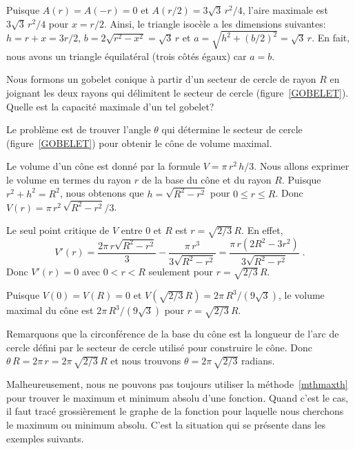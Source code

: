 {\begin{egg}[\eng]
Puisque $A(r) = A(-r) = 0$ et $A(r/2) = 3\sqrt{3}\, r^2/4$, l'aire
maximale est $3\sqrt{3}\, r^2/4$ pour $x=r/2$.  Ainsi, le triangle
isocèle a les dimensions suivantes: $h=r+x=3r/2$,
$b = 2 \sqrt{r^2-x^2} = \sqrt{3}\,r$ et
$a= \sqrt{h^2 + (b/2)^2} = \sqrt{3}\, r$.  En fait, nous avons un triangle
équilatéral (trois côtés égaux) car $a=b$.
\end{egg}


\begin{egg}[\eng]
Nous formons un gobelet conique à partir d'un secteur de cercle de rayon
$R$ en joignant les deux rayons qui délimitent le secteur de cercle
(figure~\ref{GOBELET}). Quelle est la capacité maximale d'un tel gobelet?

Le problème est de trouver l'angle $\theta$ qui détermine le secteur
de cercle (figure~\ref{GOBELET}) pour obtenir le cône de volume
maximal.

Le volume d'un cône est donné par la formule $V=\pi\,r^2\,h/3$.  Nous
allons exprimer le volume en termes du rayon $r$ de la base du cône et
du rayon $R$.  Puisque $r^2+h^2 = R^2$, nous obtenons que
$h=\sqrt{R^2-r^2}$ pour $0\leq r \leq R$.  Donc
$V(r) = \pi\,r^2\,\sqrt{R^2-r^2}/3$. 

Le seul point critique de $V$ entre $0$ et $R$ est $r=\sqrt{2/3}\,R$.
En effet,
\[
V'(r) = \frac{2\pi\,r\sqrt{R^2-r^2}}{3} -
\frac{\pi\,r^3}{3\sqrt{R^2-r^2}}
= \frac{\pi\,r(2R^2 - 3r^2)}{3\sqrt{R^2-r^2}} \; .
\]
Donc $V'(r)=0$ avec $0<r<R$ seulement pour $r=\sqrt{2/3}\, R$.

Puisque $V(0) = V(R) = 0$ et
$V\left(\sqrt{2/3}\, R\right) = 2\pi\,R^3 / (9\sqrt{3})$,
le volume maximal du cône est $2\pi\,R^3 / (9\sqrt{3})$ pour
$r = \sqrt{2/3}\, R$.

Remarquons que la circonférence de la base du cône est la longueur de
l'arc de cercle défini par le secteur de cercle utilisé pour
construire le cône.  Donc
$\theta\, R = 2\pi\,r = 2\pi\,\sqrt{2/3}\,R$ et nous trouvons
$\theta = 2\pi\,\sqrt{2/3}$ radians.
\end{egg}


Malheureusement, nous ne pouvons pas toujours utiliser la
méthode~\ref{mthmaxth} pour trouver le maximum et minimum absolu d'une
fonction.  Quand c'est le cas, il faut tracé grossièrement le graphe
de la fonction pour laquelle nous cherchons le maximum ou minimum
absolu.  C'est la situation qui se présente dans les exemples
suivants.

}
